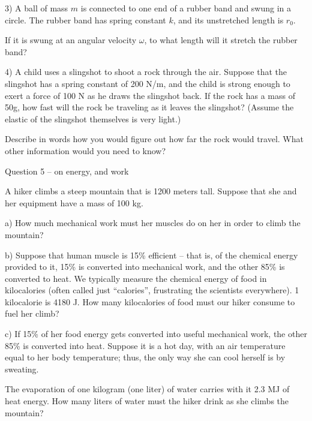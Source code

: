 \documentclass[12pt]{article}
\begin{document}
3) A ball of mass $m$ is connected to one end of a rubber band and swung in a circle. The rubber band has spring constant $k$, and
its unstretched length is $r_0$.

If it is swung at an angular velocity $\omega$, to what length will it stretch the rubber band? 

\vspace{2in}

4) A child uses a slingshot to shoot a rock through the air. Suppose that the slingshot has a spring constant of 200 N/m, and the 
child is strong enough to exert a force of 100 N as he draws the slingshot back. If the rock has a mass of 50g, how fast will the 
rock be traveling as it leaves the slingshot? (Assume the elastic of the slingshot themselves is very light.)

\vspace{1.5in}

Describe in words how you would figure out how far the rock would travel. What other information would you need to know?

\newpage
\centerline{\large Question 5 -- on energy, and work}

A hiker climbs a steep mountain that is 1200 meters tall. Suppose that she and her equipment have a mass of 100 kg.

a) How much mechanical work must her muscles do on her in order to climb the mountain?

\vspace{1in}

b) Suppose that human muscle is 15\% efficient -- that is, of the chemical energy provided to it, 15\% is converted into
mechanical work, and the other 85\% is converted to heat. We typically measure the chemical energy of food in kilocalories
(often called just ``calories'', frustrating the scientists everywhere). 1 kilocalorie is 4180 J. How many kilocalories of food
must our hiker consume to fuel her climb?

\vspace{2in}

c) If 15\% of her food energy gets converted into useful mechanical work, the other 85\% is converted into heat. Suppose it is
a hot day, with an air temperature equal to her body temperature; thus, the only way she can cool herself is by sweating.

The evaporation of one kilogram (one liter) of water carries with it 2.3 MJ of heat energy. How many liters of water must the
hiker drink as she climbs the mountain?
\end{document}
